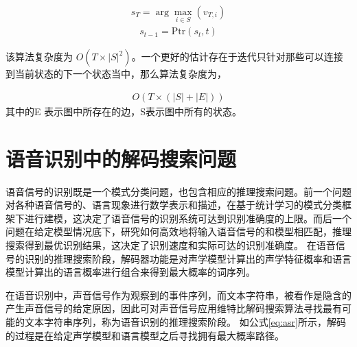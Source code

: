 \begin{equation}
\begin{split}
s_{T}=\arg \max _{i\in S}(v_{T,i})
\end{split}
\end{equation}
\begin{equation}
\begin{split}
s_{t-1}=\mathrm {Ptr} (s_{t},t)
\end{split}
\end{equation}

该算法复杂度为 $O(T\times \left|{S}\right|^{2})$。一个更好的估计存在于迭代只针对那些可以连接到当前状态的下一个状态当中，那么算法复杂度为，

\begin{equation}
\begin{split}
\label{equ:viterbi-cmp}
O(T\times (\left|{S}\right|+\left|{E}\right|))
\end{split}
\end{equation}
 其中的E 表示图中所存在的边，S表示图中所有的状态。

\section{语音识别中的解码搜索问题}
\label{sec:decode}

语音信号的识别既是一个模式分类问题，也包含相应的推理搜索问题。前一个问题对各种语音信号的、语言现象进行数学表示和描述，在基于统计学习的模式分类框架下进行建模，这决定了语音信号的识别系统可达到识别准确度的上限。而后一个问题在给定模型情况底下，研究如何高效地将输入语音信号的和模型相匹配，推理搜索得到最优识别结果，这决定了识别速度和实际可达的识别准确度。
在语音信号的识别的推理搜索阶段，解码器功能是对声学模型计算出的声学特征概率和语言模型计算出的语言概率进行组合来得到最大概率的词序列。

在语音识别中，声音信号作为观察到的事件序列，而文本字符串，被看作是隐含的产生声音信号的给定原因，因此可对声音信号应用维特比解码搜索算法寻找最有可能的文本字符串序列，称为语音识别的推理搜索阶段。
如公式\ref{eq:asr}所示，解码的过程是在给定声学模型和语言模型之后寻找拥有最大概率路径。

